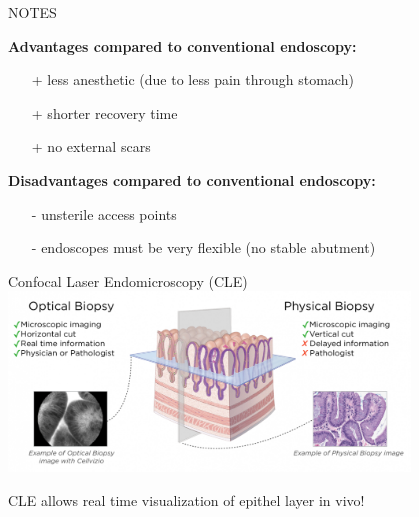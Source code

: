 \begin{frame}{NOTES}

	\textbf{Advantages compared to conventional endoscopy:}
	\begin{itemize}
		\item[+] less anesthetic (due to less pain through stomach)
		\item[+] shorter recovery time
		\item[+] no external scars
	\end{itemize}
	\vspace{1em}
	\textbf{Disadvantages compared to conventional endoscopy:}
	\begin{itemize}
		\item[-] unsterile access points
		\item[-] endoscopes must be very flexible (no stable abutment)
	\end{itemize}

\end{frame}

\begin{frame}{Confocal Laser Endomicroscopy (CLE)}
	\includegraphics[width=0.8\textwidth]{img2/basics_optical_physical.png}

	CLE allows real time visualization of epithel layer in vivo!
\end{frame}

